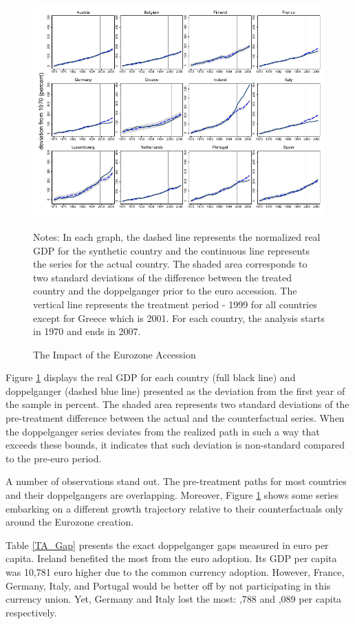 \documentclass[12pt]{article}
\newcommand{\annote}[1]{\parbox{\textwidth}{\renewcommand{\baselinestretch}{1.0}\vspace{12pt} \small Notes: #1}}
\begin{document}
\begin{figure}[h!]
    \centering
    \caption{The Impact of the Eurozone Accession}
    \includegraphics[scale=1.15]{SCM_gdp_Annual.pdf}
    \annote{In each graph, the dashed line represents the normalized real GDP for the synthetic country and the continuous line represents the series for the actual country. The shaded area corresponds to two standard deviations of the difference between the treated country and the doppelganger prior to the euro accession. The vertical line represents the treatment period - 1999 for all countries except for Greece which is 2001. For each country, the analysis starts in 1970 and ends in 2007.
    }
    \label{F_1}
\end{figure}

Figure \ref{F_1} displays the real GDP for each country (full black line) and doppelganger (dashed blue line) presented as the deviation from the first year of the sample in percent. The shaded area represents two standard deviations of the pre-treatment difference between the actual and the counterfactual series. When the doppelganger series deviates from the realized path in such a way that exceeds these bounds, it indicates that such deviation is non-standard compared to the pre-euro period.

A number of observations stand out. The pre-treatment paths for most countries and their doppelgangers are overlapping. Moreover, Figure \ref{F_1} shows some series embarking on a different growth trajectory relative to their counterfactuals only around the Eurozone creation. 

Table \ref{TA_Gap} presents the exact doppelganger gaps measured in euro per capita. Ireland benefited the most from the euro adoption. Its GDP per capita was 10,781 euro higher due to the common currency adoption. However, France, Germany, Italy, and Portugal would be better off by not participating in this currency union. Yet, Germany and Italy lost the most: ,788 and ,089 per capita respectively.
\end{document}
